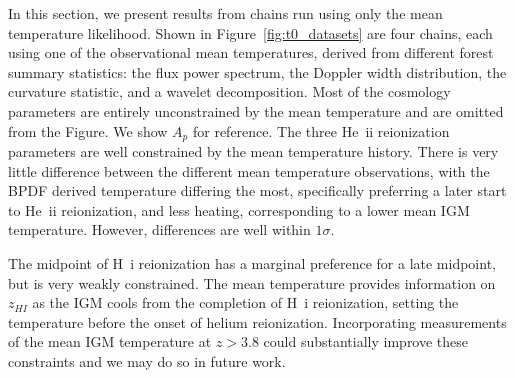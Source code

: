 In this section, we present results from chains run using only the mean temperature likelihood.
Shown in Figure~\ref{fig:t0_datasets} are four chains, each using one of the observational mean temperatures, derived from different \lya forest summary statistics: the flux power spectrum, the Doppler width distribution, the curvature statistic, and a wavelet decomposition.
Most of the cosmology parameters are entirely unconstrained by the mean temperature and are omitted from the Figure.
We show $A_p$ for reference.
The three He~{\sc ii} reionization parameters are well constrained by the mean temperature history.
There is very little difference between the different mean temperature observations, with the BPDF derived temperature differing the most, specifically preferring a later start to He~{\sc ii} reionization, and less heating, corresponding to a lower mean IGM temperature.
However, differences are well within $1\sigma$.

The midpoint of H~{\sc i} reionization has a marginal preference for a late midpoint, but is very weakly constrained.
The mean temperature provides information on $z_{HI}$ as the IGM cools from the completion of H~{\sc i} reionization, setting the temperature before the onset of helium reionization.
Incorporating measurements of the mean IGM temperature at $z > 3.8$  \cite[e.g.~][]{2023arXiv230402038G} could substantially improve these constraints and we may do so in future work.

